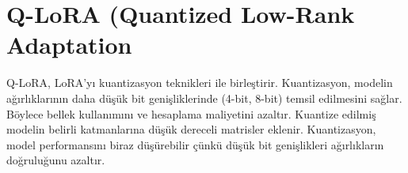 \section{Q-LoRA (Quantized Low-Rank Adaptation}

Q-LoRA, LoRA'yı kuantizasyon teknikleri ile birleştirir. Kuantizasyon, modelin ağırlıklarının daha düşük bit genişliklerinde (4-bit, 8-bit) temsil edilmesini sağlar. Böylece bellek kullanımını ve hesaplama maliyetini azaltır. Kuantize edilmiş modelin belirli katmanlarına düşük dereceli matrisler eklenir. Kuantizasyon, model performansını biraz düşürebilir çünkü düşük bit genişlikleri ağırlıkların doğruluğunu azaltır.


\newpage